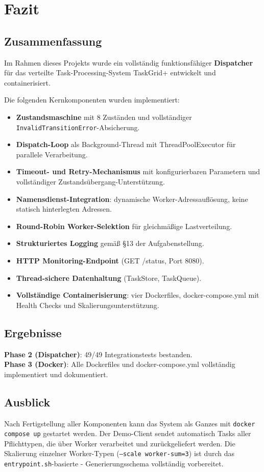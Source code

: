 \section{Fazit}

\subsection{Zusammenfassung}

Im Rahmen dieses Projekts wurde ein vollständig funktionsfähiger
\textbf{Dispatcher} für das verteilte Task-Processing-System TaskGrid+
entwickelt und containerisiert.

Die folgenden Kernkomponenten wurden implementiert:

\begin{itemize}
  \item \textbf{Zustandsmaschine} mit 8 Zuständen und vollständiger
        \texttt{InvalidTransitionError}-Absicherung.
  \item \textbf{Dispatch-Loop} als Background-Thread mit ThreadPoolExecutor
        für parallele Verarbeitung.
  \item \textbf{Timeout- und Retry-Mechanismus} mit konfigurierbaren
        Parametern und vollständiger Zustandsübergang-Unterstützung.
  \item \textbf{Namensdienst-Integration}: dynamische Worker-Adressauflösung,
        keine statisch hinterlegten Adressen.
  \item \textbf{Round-Robin Worker-Selektion} für gleichmäßige Lastverteilung.
  \item \textbf{Strukturiertes Logging} gemäß §13 der Aufgabenstellung.
  \item \textbf{HTTP Monitoring-Endpoint} (GET /status, Port 8080).
  \item \textbf{Thread-sichere Datenhaltung} (TaskStore, TaskQueue).
  \item \textbf{Vollständige Containerisierung}: vier Dockerfiles,
        docker-compose.yml mit Health Checks und Skalierungsunterstützung.
\end{itemize}

\subsection{Ergebnisse}

\textbf{Phase 2 (Dispatcher)}: 49/49 Integrationstests bestanden. \\
\textbf{Phase 3 (Docker)}: Alle Dockerfiles und docker-compose.yml
vollständig implementiert und dokumentiert.

\subsection{Ausblick}

Nach Fertigstellung aller Komponenten kann das System als Ganzes
mit \texttt{docker compose up} gestartet werden.
Der Demo-Client sendet automatisch Tasks aller Pflichttypen,
die über Worker verarbeitet und zurückgeliefert werden.
Die Skalierung einzelner Worker-Typen (\texttt{--scale worker-sum=3})
ist durch das \texttt{entrypoint.sh}-basierte
- Generierungsschema vollständig vorbereitet.
